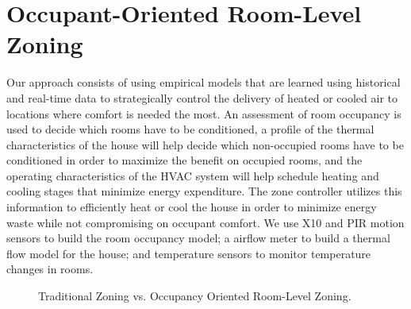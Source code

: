 \chapter{Occupant-Oriented Room-Level Zoning}

Our approach consists of using empirical models that are learned using
historical and real-time data to strategically control the delivery of heated or
cooled air to locations where comfort is needed the most. An assessment of room
occupancy is used to decide which rooms have to be conditioned, a profile of the
thermal characteristics of the house will help decide which non-occupied rooms
have to be conditioned in order to maximize the benefit on occupied rooms, and
the operating characteristics of the HVAC system will help schedule heating and
cooling stages that minimize energy expenditure. The zone controller utilizes
this information to efficiently heat or cool the house in order to minimize
energy waste while not compromising on occupant comfort. We use X10 and PIR
motion sensors to build the room occupancy model; a airflow meter to build a
thermal flow model for the house; and temperature sensors to monitor temperature
changes in rooms.

\begin{figure}[t]
  \centering    
  \hspace{0.25in}
  \caption{Traditional Zoning vs. Occupancy Oriented Room-Level Zoning.}
  \label{fig:systemOverview}
\end{figure}

